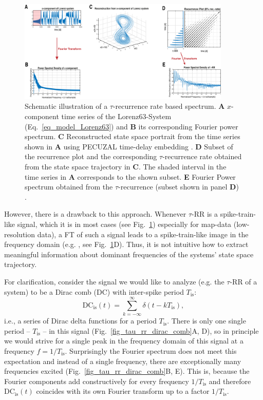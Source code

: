 \begin{figure}
 \centering
 \includegraphics[width=0.9\textwidth]{./figures/fig_tau_rr_spectrum_example}
 \caption{Schematic illustration of a $\tau$-recurrence rate based spectrum. \textbf{A} $x$-component time series of the Lorenz63-System (Eq.~\eqref{eq_model_Lorenz63}) and 
 \textbf{B} its corresponding Fourier power spectrum. 
 \textbf{C} Reconstructed state space portrait from the time series shown in \textbf{A} using PECUZAL time-delay embedding \cite{Kraemer2021}. 
 \textbf{D} Subset of the recurrence plot and the corresponding $\tau$-recurrence rate obtained from the state space trajectory in \textbf{C}. The shaded interval in the time series in \textbf{A} corresponds to the shown subset. 
 \textbf{E} Fourier Power spectrum obtained from the $\tau$-recurrence (subset shown in panel \textbf{D}) \cite{Zbilut2008}.
 }\label{fig_tau_rr_spectrum_example}
\end{figure}

However, there is a drawback to this approach. Whenever $\tau$-RR is a spike-train-like signal, which it is in most cases (see Fig.~\ref{fig_tau_rr_spectrum_example}) especially for 
map-data (low-resolution data), a FT of such a signal leads to a spike-train-like image in the frequency domain (e.g. \cite{Schild1982,Cordoba1989}, see 
Fig.~\ref{fig_tau_rr_spectrum_example}D). Thus, it is not intuitive how to extract meaningful information about dominant frequencies of the systems' state space trajectory. 

For clarification, consider the signal we would like to analyze 
(e.g. the $\tau$-RR of a system) to be a Dirac comb (DC) with inter-spike period $T_\text{is}$: 
\begin{equation}
\text{DC}_{\text{is}}(t) = \sum_{k=-\infty}^{\infty} \delta(t-kT_\text{is}),
\label{eq_dirac_comb}
\end{equation}
i.e., a series of Dirac delta functions for a period $T_\text{is}$. There is only one single period -- $T_\text{is}$ -- in this signal (Fig.~\ref{fig_tau_rr_dirac_comb}A, D), so 
in principle we would strive for a single peak in the frequency domain of this signal at a frequency $f=1/T_\text{is}$. Surprisingly the Fourier spectrum does not meet this expectation 
and instead of a single frequency, there are exceptionally many frequencies excited (Fig.~\ref{fig_tau_rr_dirac_comb}B, E). This is, because the Fourier components add constructively 
for every frequency $1/T_\text{is}$ and therefore $\text{DC}_{\text{is}}(t)$ coincides with its own Fourier transform up to a factor $1/T_\text{is}$.

